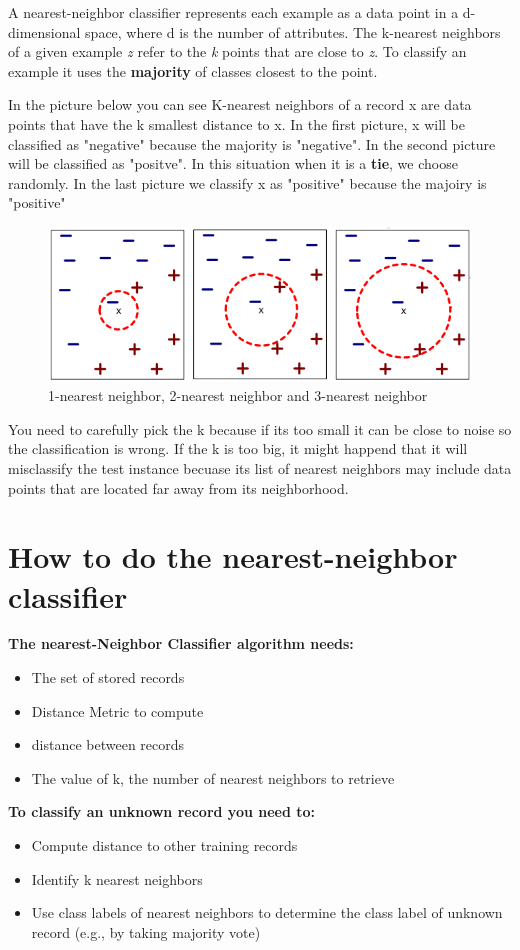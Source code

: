 		\vspace{0.3cm}

		A nearest-neighbor classifier represents each example as a data point
		in a d-dimensional space, where d is the number of attributes. 
		The k-nearest neighbors of a given example {\it z} refer to the
		{\it k} points that are close to {\it z}.
		To classify an example it uses the {\bf majority} of classes closest to the point.

		In the picture below you can see K-nearest neighbors of a record x are data 
		points that have the k smallest distance to x. In the first picture, x will
		be classified as "negative" because the majority is "negative".
		In the second picture will be classified as "positve".
		In this situation when it is a {\bf tie}, we choose randomly. 
		In the last picture	we classify x as "positive" because the majoiry is "positive"
		
		\begin{figure}[H]
			\includegraphics[width=\textwidth]{pics/knearest.png}
			\caption{1-nearest neighbor, 2-nearest neighbor and 3-nearest neighbor}
		\end{figure}

		You need to carefully pick the k because if its too small it can be close to noise
		so the classification is wrong. If the k is too big, it might happend that it
		will misclassify the test instance becuase its list of nearest neighbors may include
		data points that are located far away from its neighborhood.

		\clearpage
		\section{How to do the nearest-neighbor classifier}
		{\bf The nearest-Neighbor Classifier algorithm needs:}
			\begin{itemize}
				\item The set of stored records 
				\item Distance Metric to compute 
				\item distance between records
				\item The value of k, the number of nearest neighbors to retrieve 
			\end{itemize}
		{\bf To classify an unknown record you need to:}
			\begin{itemize}
				\item Compute distance to other training records
				\item Identify k nearest neighbors 
				\item Use class labels of nearest neighbors to determine the class 
				label of unknown record (e.g., by taking majority vote)
			\end{itemize}


